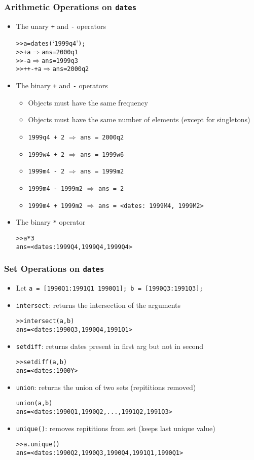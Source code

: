 \documentclass[10pt]{beamer}
\newcommand{\myitem}{\item[$\bullet$]}
\begin{document}
\begin{frame}[fragile,t]
  \frametitle{Arithmetic Operations on \texttt{dates}}
  \begin{itemize}
    \myitem The unary \texttt{+} and \texttt{-} operators
    \begin{alltt}
  >> a = dates(`1999q4');
  >> +a \(\Rightarrow\) ans = 2000q1
  >> -a \(\Rightarrow\) ans = 1999q3
  >> ++-+a \(\Rightarrow\) ans = 2000q2
    \end{alltt}
    \myitem The binary \texttt{+} and \texttt{-} operators
    \begin{itemize}
      \myitem Objects must have the same frequency
      \myitem Objects must have the same number of elements (except for singletons)
      \myitem \texttt{1999q4 + 2} $\Rightarrow$ \texttt{ans = 2000q2}
      \myitem \texttt{1999w4 + 2} $\Rightarrow$ \texttt{ans = 1999w6}
      \myitem \texttt{1999m4 - 2} $\Rightarrow$ \texttt{ans = 1999m2}
      \myitem \texttt{1999m4 - 1999m2} $\Rightarrow$ \texttt{ans = 2}
      \myitem \texttt{1999m4 + 1999m2} $\Rightarrow$ \texttt{ans = <dates: 1999M4, 1999M2>}
    \end{itemize}
    \myitem The binary \texttt{*} operator
    \begin{alltt}
  >> a*3
  ans = <dates: 1999Q4, 1999Q4, 1999Q4>
    \end{alltt}
  \end{itemize}
\end{frame}



\begin{frame}[fragile,t]
  \frametitle{Set Operations on \texttt{dates}}
  \begin{itemize}
    \myitem Let \texttt{a = [1990Q1:1991Q1 1990Q1]; b = [1990Q3:1991Q3];}
    \myitem \texttt{intersect}: returns the intersection of the arguments
    \begin{alltt}
  >> intersect(a, b)
  ans = <dates: 1990Q3, 1990Q4, 1991Q1>
    \end{alltt}
    \myitem \texttt{setdiff}: returns dates present in first arg but not in second
    \begin{alltt}
  >> setdiff(a, b)
  ans = <dates: 1900Y>
    \end{alltt}
    \myitem \texttt{union}: returns the union of two sets (repititions removed)
    \begin{alltt}
  union(a, b)
  ans = <dates: 1990Q1, 1990Q2,  ..., 1991Q2, 1991Q3>
    \end{alltt}
    \myitem \texttt{unique()}: removes repititions from set (keeps last unique value)
    \begin{alltt}
  >> a.unique()
  ans = <dates: 1990Q2, 1990Q3, 1990Q4, 1991Q1, 1990Q1>
    \end{alltt}
  \end{itemize}
\end{frame}
\end{document}
